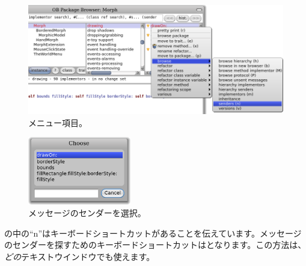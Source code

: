 \documentclass[a4paper,10pt,twoside]{book}
\begin{document}
\begin{figure}[htb]
\centerline {\includegraphics[width=\textwidth]{SendersOfDrawOn}}
\caption{メニュー項目。}
\end{figure}

\begin{figure}[htb]
\centerline {\includegraphics[width=0.4\textwidth]{SendersOfDrawOn2}}
\caption{メッセージのセンダーを選択。}
\end{figure}

の中の``n''はキーボードショートカットがあることを伝えています。メッセージのセンダーを探すためのキーボードショートカットはとなります。この方法は、\emph{どの}テキストウインドウでも使えます。

\end{document}

